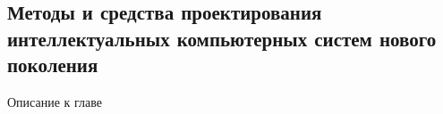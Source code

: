 
\begin{partbacktext}
\part{Методы и средства проектирования интеллектуальных компьютерных систем нового поколения}
\noindent Описание к главе
\end{partbacktext}